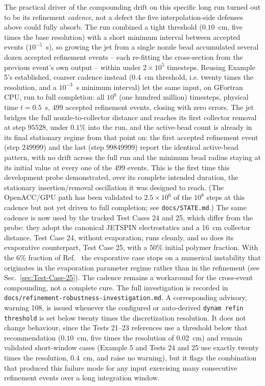The practical driver of the compounding drift on this specific long run
turned out to be its refinement \emph{cadence}, not a defect the five
interpolation-side defenses above could fully absorb. The run combined a
tight threshold ($0.10$~cm, five times the base resolution) with a short
minimum interval between accepted events ($10^{-5}$~s), so growing the jet
from a single nozzle bead accumulated several dozen accepted refinement
events -- each re-fitting the cross-section from the previous event's own
output -- within under $2\times10^{5}$ timesteps. Reusing Example 5's
established, coarser cadence instead ($0.4$~cm threshold, i.e. twenty times
the resolution, and a $10^{-3}$~s minimum interval) let the same input, on
GFortran CPU, run to full completion: all $10^{8}$ (one hundred million)
timesteps, physical time $t=0.5$~s, 499 accepted refinement events,
closing with zero errors. The jet bridges the full nozzle-to-collector
distance and reaches its first collector removal at step $95528$, under
$0.1\%$ into the run, and the active-bead count is already in its final
stationary regime from that point on: the first accepted refinement event
(step $249999$) and the last (step $99849999$) report the identical
active-bead pattern, with no drift across the full run and the minimum
bead radius staying at its initial value at every one of the 499 events.
This is the first time this development probe demonstrated, over its
complete intended duration, the stationary insertion/removal oscillation it
was designed to reach. (The OpenACC/GPU path has been validated to
$2.5\times10^{6}$ of the $10^{8}$ steps at this cadence but not yet driven to
full completion; see \texttt{docs/STATE.md}.) The same cadence is now used by
the tracked Test Cases 24 and 25, which differ from the probe: they adopt the
canonical JETSPIN electrostatics and a 16~cm collector distance. Test Case 24,
without evaporation, runs cleanly, and so does its evaporative counterpart,
Test Case 25, with a 50\% initial polymer fraction.  With the 6\% fraction
of Ref.~\cite{yarin2001bending} the evaporative case stops on a numerical
instability that originates in the evaporation parameter regime rather than
in the refinement (see Sec.~\ref{sec:Test-Case-25}).  The cadence remains a
workaround for the cross-event compounding, not a complete cure. The full investigation is recorded in
\texttt{docs/refinement-robustness-investigation.md}. A corresponding advisory, warning 108, is
issued whenever the
configured or auto-derived \texttt{dynam refin threshold} is set below
twenty times the discretization resolution. It does not change behaviour,
since the Tests 21--23 references use a threshold below that recommendation
($0.10$~cm, five times the resolution of $0.02$~cm) and remain validated
short-window cases (Example 5 and Tests 24 and 25 use exactly twenty
times the resolution, $0.4$~cm, and raise no warning), but it flags the
combination that produced this failure mode for any input
exercising many consecutive refinement events over a long integration
window.

